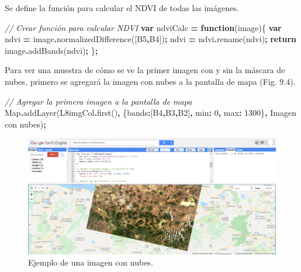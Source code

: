 \documentclass[
  12pt,
  letterpaper,
  twoside]{book}
\newenvironment{Shaded}{\begin{snugshade}}{\end{snugshade}}
\newcommand{\BuiltInTok}[1]{#1}
\newcommand{\CommentTok}[1]{\textcolor[rgb]{0.56,0.35,0.01}{\textit{#1}}}
\newcommand{\ControlFlowTok}[1]{\textcolor[rgb]{0.13,0.29,0.53}{\textbf{#1}}}
\newcommand{\DataTypeTok}[1]{\textcolor[rgb]{0.13,0.29,0.53}{#1}}
\newcommand{\DecValTok}[1]{\textcolor[rgb]{0.00,0.00,0.81}{#1}}
\newcommand{\FunctionTok}[1]{\textcolor[rgb]{0.00,0.00,0.00}{#1}}
\newcommand{\KeywordTok}[1]{\textcolor[rgb]{0.13,0.29,0.53}{\textbf{#1}}}
\newcommand{\NormalTok}[1]{#1}
\newcommand{\OperatorTok}[1]{\textcolor[rgb]{0.81,0.36,0.00}{\textbf{#1}}}
\newcommand{\StringTok}[1]{\textcolor[rgb]{0.31,0.60,0.02}{#1}}
\begin{document}
Se define la función para calcular el NDVI de todas las imágenes.

\begin{Shaded}
\begin{Highlighting}[]
\CommentTok{// Crear función para calcular NDVI}
\KeywordTok{var}\NormalTok{ ndviCalc }\OperatorTok{=} \KeywordTok{function}\NormalTok{(image)\{}
  \KeywordTok{var}\NormalTok{ ndvi }\OperatorTok{=}\NormalTok{ image}\OperatorTok{.}\FunctionTok{normalizedDifference}\NormalTok{([}\StringTok{\textquotesingle{}B5\textquotesingle{}}\OperatorTok{,}\StringTok{\textquotesingle{}B4\textquotesingle{}}\NormalTok{])}\OperatorTok{;}
\NormalTok{  ndvi }\OperatorTok{=}\NormalTok{ ndvi}\OperatorTok{.}\FunctionTok{rename}\NormalTok{(}\StringTok{\textquotesingle{}ndvi\textquotesingle{}}\NormalTok{)}\OperatorTok{;}
    \ControlFlowTok{return}\NormalTok{ image}\OperatorTok{.}\FunctionTok{addBands}\NormalTok{(ndvi)}\OperatorTok{;}
\NormalTok{\}}\OperatorTok{;}
\end{Highlighting}
\end{Shaded}

Para ver una muestra de cómo se ve la primer imagen con y sin la máscara de nubes, primero se agregará la imagen con nubes a la pantalla de mapa (Fig. 9.4).

\begin{Shaded}
\begin{Highlighting}[]
\CommentTok{// Agregar la primera imagen a la pantalla de mapa}
\BuiltInTok{Map}\OperatorTok{.}\FunctionTok{addLayer}\NormalTok{(L8imgCol}\OperatorTok{.}\FunctionTok{first}\NormalTok{()}\OperatorTok{,} 
\NormalTok{  \{}\DataTypeTok{bands}\OperatorTok{:}\NormalTok{[}\StringTok{\textquotesingle{}B4\textquotesingle{}}\OperatorTok{,}\StringTok{\textquotesingle{}B3\textquotesingle{}}\OperatorTok{,}\StringTok{\textquotesingle{}B2\textquotesingle{}}\NormalTok{]}\OperatorTok{,} \DataTypeTok{min}\OperatorTok{:} \DecValTok{0}\OperatorTok{,} \DataTypeTok{max}\OperatorTok{:} \DecValTok{1300}\NormalTok{\}}\OperatorTok{,}
  \StringTok{\textquotesingle{}Imagen con nubes\textquotesingle{}}\NormalTok{)}\OperatorTok{;}
\end{Highlighting}
\end{Shaded}

\begin{figure}[btp]

{\centering \includegraphics[width=1\linewidth]{Img/imNubes} 

}

\caption{Ejemplo de una imagen con nubes.}\label{fig:unnamed-chunk-154}
\end{figure}
\end{document}
